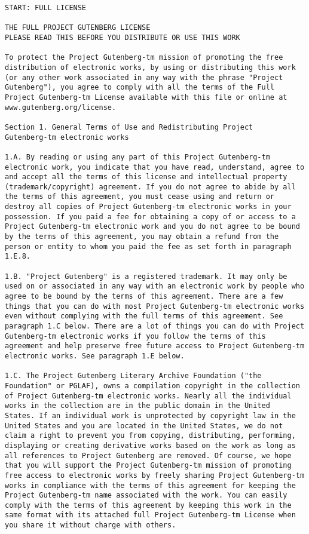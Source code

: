 \documentclass{book}[2021/07/26]
\begin{document}
\begin{mainmatter}
\begin{spacing}{1.3}
\begin{verbatim}
START: FULL LICENSE

THE FULL PROJECT GUTENBERG LICENSE
PLEASE READ THIS BEFORE YOU DISTRIBUTE OR USE THIS WORK

To protect the Project Gutenberg-tm mission of promoting the free
distribution of electronic works, by using or distributing this work
(or any other work associated in any way with the phrase "Project
Gutenberg"), you agree to comply with all the terms of the Full
Project Gutenberg-tm License available with this file or online at
www.gutenberg.org/license.

Section 1. General Terms of Use and Redistributing Project
Gutenberg-tm electronic works

1.A. By reading or using any part of this Project Gutenberg-tm
electronic work, you indicate that you have read, understand, agree to
and accept all the terms of this license and intellectual property
(trademark/copyright) agreement. If you do not agree to abide by all
the terms of this agreement, you must cease using and return or
destroy all copies of Project Gutenberg-tm electronic works in your
possession. If you paid a fee for obtaining a copy of or access to a
Project Gutenberg-tm electronic work and you do not agree to be bound
by the terms of this agreement, you may obtain a refund from the
person or entity to whom you paid the fee as set forth in paragraph
1.E.8.

1.B. "Project Gutenberg" is a registered trademark. It may only be
used on or associated in any way with an electronic work by people who
agree to be bound by the terms of this agreement. There are a few
things that you can do with most Project Gutenberg-tm electronic works
even without complying with the full terms of this agreement. See
paragraph 1.C below. There are a lot of things you can do with Project
Gutenberg-tm electronic works if you follow the terms of this
agreement and help preserve free future access to Project Gutenberg-tm
electronic works. See paragraph 1.E below.

1.C. The Project Gutenberg Literary Archive Foundation ("the
Foundation" or PGLAF), owns a compilation copyright in the collection
of Project Gutenberg-tm electronic works. Nearly all the individual
works in the collection are in the public domain in the United
States. If an individual work is unprotected by copyright law in the
United States and you are located in the United States, we do not
claim a right to prevent you from copying, distributing, performing,
displaying or creating derivative works based on the work as long as
all references to Project Gutenberg are removed. Of course, we hope
that you will support the Project Gutenberg-tm mission of promoting
free access to electronic works by freely sharing Project Gutenberg-tm
works in compliance with the terms of this agreement for keeping the
Project Gutenberg-tm name associated with the work. You can easily
comply with the terms of this agreement by keeping this work in the
same format with its attached full Project Gutenberg-tm License when
you share it without charge with others.


\end{verbatim}
\end{spacing}
\end{mainmatter}
\end{document}

